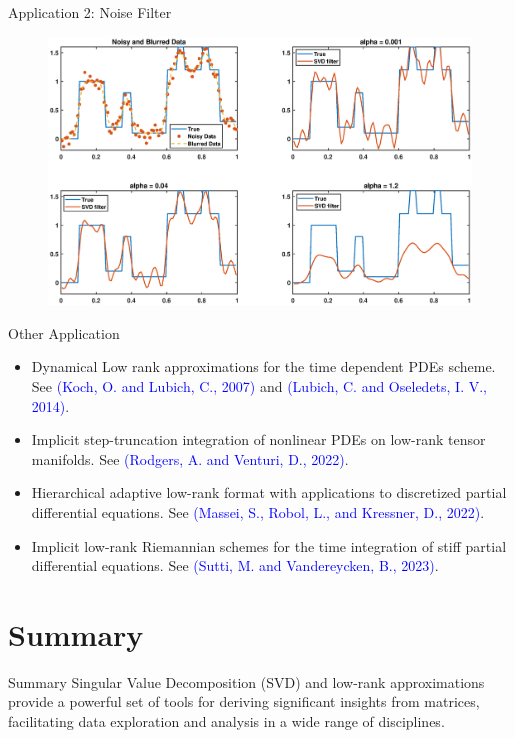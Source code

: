 \documentclass[aspectratio=169,xcolor=dvipsnames]{beamer}
\begin{document}
\begin{frame}{Application 2: Noise Filter}
     \begin{figure}[h]
\includegraphics[width=13cm]{images/noisy_and_blurred.eps}
\label{Fig4}
\end{figure}
\end{frame}

\begin{frame}{Other Application}
    \begin{itemize}
        \item Dynamical Low rank approximations for the time dependent PDEs scheme. See \textcolor{blue}{(Koch, O. and Lubich, C., 2007)} and \textcolor{blue}{(Lubich, C. and Oseledets, I. V., 2014)}.
        \item  Implicit step-truncation integration of nonlinear PDEs on low-rank tensor manifolds. See \textcolor{blue}{(Rodgers, A. and Venturi, D., 2022)}.
        \item  Hierarchical adaptive low-rank format with applications
to discretized partial differential equations. See \textcolor{blue}{(Massei, S., Robol, L., and Kressner, D., 2022)}.
\item Implicit low-rank Riemannian schemes for the time
integration of stiff partial differential equations. See \textcolor{blue}{(Sutti, M. and Vandereycken, B., 2023)}.
    \end{itemize}
\end{frame}

\section{Summary}

\begin{frame}{Summary}
  Singular Value Decomposition (SVD) and low-rank approximations provide a powerful set of tools for deriving significant insights from matrices, facilitating data exploration and analysis in a wide range of disciplines.
\end{frame}
\end{document}
